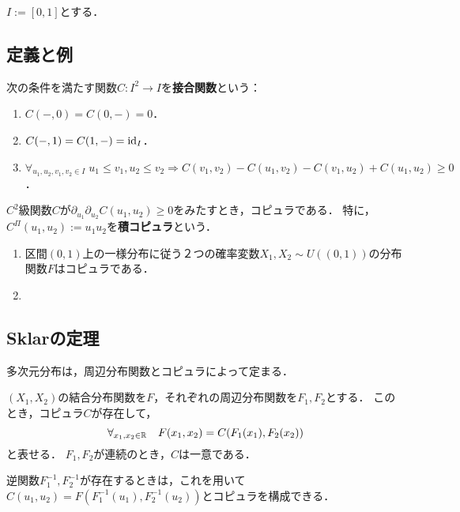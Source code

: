 \documentclass[uplatex,dvipdfmx]{jsreport}
\begin{document}
\begin{notation}
    $I:=[0,1]$とする．
\end{notation}

\subsection{定義と例}

\begin{definition}[copula]
    次の条件を満たす関数$C:I^2\to I$を\textbf{接合関数}という：
    \begin{enumerate}
        \item $C(-,0)=C(0,-)=0$．
        \item $C(-,1)=C(1,-)=\mathrm{id}_I$．
        \item $\forall_{u_1,u_2,v_1,v_2\in I}\;u_1\le v_1,u_2\le v_2\Rightarrow C(v_1,v_2)-C(u_1,v_2)-C(v_1,u_2)+C(u_1,u_2)\ge0$．
    \end{enumerate}
\end{definition}

\begin{example}
    $C^2$級関数$C$が$\partial_{u_1}\partial_{u_2}C(u_1,u_2)\ge0$をみたすとき，コピュラである．
    特に，$C^\Pi(u_1,u_2):=u_1u_2$を\textbf{積コピュラ}という．
\end{example}

\begin{example}[二次元の分布関数が定めるコピュラ]
    \begin{enumerate}\mbox{}
        \item 区間$(0,1)$上の一様分布に従う２つの確率変数$X_1,X_2\sim U((0,1))$の分布関数$F$はコピュラである．
        \item 
    \end{enumerate}
\end{example}

\subsection{Sklarの定理}

\begin{tcolorbox}[colframe=ForestGreen, colback=ForestGreen!10!white,breakable,colbacktitle=ForestGreen!40!white,coltitle=black,fonttitle=\bfseries\sffamily,
title=]
    多次元分布は，周辺分布関数とコピュラによって定まる．
\end{tcolorbox}

\begin{theorem}
    $(X_1,X_2)$の結合分布関数を$F$，それぞれの周辺分布関数を$F_1,F_2$とする．
    このとき，コピュラ$C$が存在して，
    \[\forall_{x_1,x_2\in\mathbb{R}}\quad F(x_1,x_2)=C(F_1(x_1),F_2(x_2))\]
    と表せる．
    $F_1,F_2$が連続のとき，$C$は一意である．
\end{theorem}
\begin{remarks}
    逆関数$F_1^{-1},F_2^{-1}$が存在するときは，これを用いて$C(u_1,u_2)=F(F_1^{-1}(u_1),F_2^{-1}(u_2))$とコピュラを構成できる．
\end{remarks}
\end{document}
